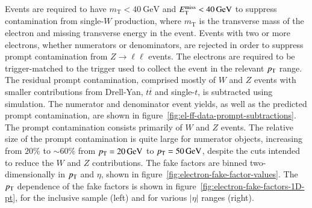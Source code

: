 Events are required to have $m_{\mathrm{T}}<\SI{40}{\giga\electronvolt}$ and $E_{\text{T}}^{\text{miss}}<\SI{40}{\giga\electronvolt}$ to suppress contamination from single-$W$ production, where $m_{\mathrm{T}}$ is the transverse mass of the electron and missing transverse energy in the event. Events with two or more electrons, whether numerators or denominators, are rejected in order to suppress prompt contamination from $Z\rightarrow \ell\ell$ events. The electrons are required to be trigger-matched to the trigger used to collect the event in the relevant $p_{\text{T}}$ range. The residual prompt contamination, comprised mostly of $W$ and $Z$ events with smaller contributions from Drell-Yan, $t\overline{t}$ and single-$t$, is subtracted using simulation. The numerator and denominator event yields, as well as the predicted prompt contamination, are shown in figure~\ref{fig:el-ff-data-prompt-subtractions}. The prompt contamination consists primarily of $W$ and $Z$ events. The relative size of the prompt contamination is quite large for numerator objects, increasing from $20\%$ to $\sim60\%$ from $p_{\text{T}}=\SI{20}{\giga\electronvolt}$ to $p_{\text{T}}=\SI{50}{\giga\electronvolt}$, despite the cuts intended to reduce the $W$ and $Z$ contributions. The fake factors are binned two-dimensionally in $p_{\text{T}}$ and $\eta$, shown in figure~\ref{fig:electron-fake-factor-values}. The $p_{\text{T}}$ dependence of the fake factors is shown in figure~\ref{fig:electron-fake-factors-1D-pt}, for the inclusive sample (left) and for various $|\eta|$ ranges (right).

